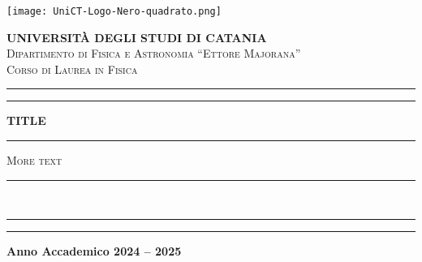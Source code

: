 \newcommand{\unictsize}{0.3\textwidth}
\newcommand{\dfasize}{0.6\textwidth}
\newcommand{\namesize}{0.8\textwidth}
\newcommand{\doublerule}{\hrule \vspace{5pt} \hrule}

\begin{titlingpage}
    \begin{center}
        \begin{minipage}[h!]{\linewidth}
            \begin{minipage}[ht!]{\linewidth}
                \centering
                \texttt{[image: UniCT-Logo-Nero-quadrato.png]}
            \end{minipage}
            \centering\large
            \textbf{UNIVERSITÀ DEGLI STUDI DI CATANIA}
            \\[5pt]
            \normalsize
            \textsc{Dipartimento di Fisica e Astronomia ``Ettore Majorana''}
            \\[5pt]
            \textsc{Corso di Laurea in Fisica}
            \\[10pt]
            \doublerule
        \end{minipage}
        \vfill
        {\Huge\bfseries TITLE}
        \vfill
        \begin{minipage}[h]{0.4\textwidth}
            \centering
            \hrule
            \vspace{10pt}
            \textsc{More text}
            \vspace{10pt}
            \hrule
        \end{minipage}
        \\[50pt]
        \vspace{\fill}
        \vspace{30pt}
        \doublerule
        \vspace{10pt}
        \normalsize
        \textbf{Anno Accademico 2024 -- 2025}
    \end{center}
\end{titlingpage}
\restoregeometry